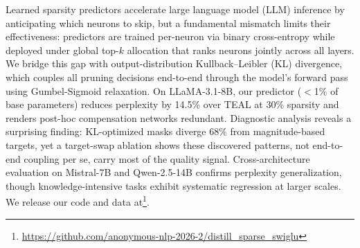 Learned sparsity predictors accelerate large language model (LLM) inference by anticipating which neurons to skip, but a fundamental mismatch limits their effectiveness: predictors are trained per-neuron via binary cross-entropy while deployed under global top-$k$ allocation that ranks neurons jointly across all layers.
We bridge this gap with output-distribution Kullback--Leibler (KL) divergence, which couples all pruning decisions end-to-end through the model's forward pass using Gumbel-Sigmoid relaxation.
On LLaMA-3.1-8B, our predictor ($<$1\% of base parameters) reduces perplexity by 14.5\% over TEAL at 30\% sparsity and renders post-hoc compensation networks redundant.
Diagnostic analysis reveals a surprising finding: KL-optimized masks diverge 68\% from magnitude-based targets, yet a target-swap ablation shows these discovered patterns, not end-to-end coupling per se, carry most of the quality signal.
Cross-architecture evaluation on Mistral-7B and Qwen-2.5-14B confirms perplexity generalization, though knowledge-intensive tasks exhibit systematic regression at larger scales.
We release our code and data at\footnote{\url{https://github.com/anonymous-nlp-2026-2/distill_sparse_swiglu}}.
